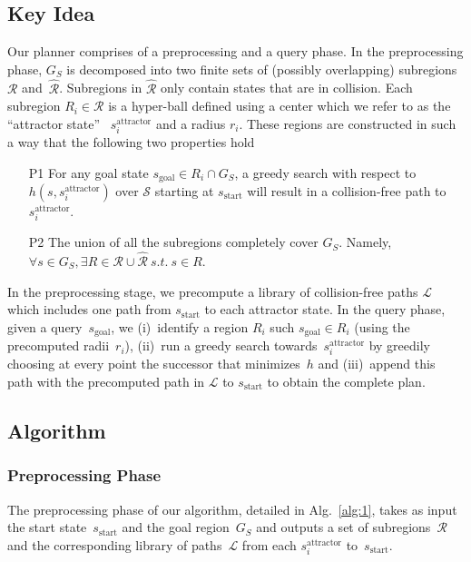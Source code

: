 \documentclass[letterpaper, 10 pt, conference]{ieeeconf}  %
\newcommand{\calL}{\ensuremath{\mathcal{L}}\xspace}
\newcommand{\calS}{\ensuremath{\mathcal{S}}\xspace}
\newcommand{\calR}{\ensuremath{\mathcal{R}}\xspace}
\newcommand{\sAttract}{\ensuremath{s^{\text{attractor}}_i}\xspace}
\newcommand{\sStart}{\ensuremath{s_{\text{start}}\xspace}}
\newcommand{\sGoal}{\ensuremath{s_{\text{goal}}\xspace}}
\begin{document}
\subsection{Key Idea}
Our planner comprises of a preprocessing and a query phase. 
In the preprocessing phase, $G_S$ is decomposed into two finite  sets of (possibly overlapping) subregions $\calR$ and~$\hat{\calR}$.
Subregions in $\hat{\calR}$ only contain states that are in collision.
Each subregion $R_i \in \calR$ is a hyper-ball defined using a center which we refer to as the ``attractor state''~
\sAttract and a radius $r_i$.
These regions are constructed in such a way that the following two properties hold
\begin{enumerate}
  \item[P1] For any goal state $s_{\text{goal}} \in R_i \cap G_S$, a greedy search with respect to $h(s, \sAttract)$ over $\calS$ starting at $\sStart$ will result in a collision-free path to \sAttract.
  \item[P2] The union of all the subregions completely cover $G_S$. 
  		Namely, $\forall s \in G_S, \exists R \in \calR \cup \hat{\calR} \ s.t. \ s \in R$.
\end{enumerate}

In the preprocessing stage, we precompute a library of collision-free paths $\calL$ which includes one path from $\sStart$ to each attractor state. 
In the query phase, given a query~\sGoal, we 
(i)~identify a region $R_i$ such $\sGoal \in R_i$ (using the precomputed radii~$r_i$),
(ii)~run a greedy search towards~\sAttract by greedily choosing at every point the successor that minimizes~$h$ and
(iii)~append this path with the precomputed path in $\calL$ to $\sStart$ to obtain the complete plan.

\subsection {Algorithm}
\subsubsection{Preprocessing Phase}
The preprocessing phase of our algorithm, detailed in Alg.~\ref{alg:1}, takes as input the start state~$\sStart$ and the goal region~$G_S$ and outputs a set of subregions~$\calR$ and the corresponding library of paths~$\calL$ from each \sAttract to~\sStart. 
\end{document}
